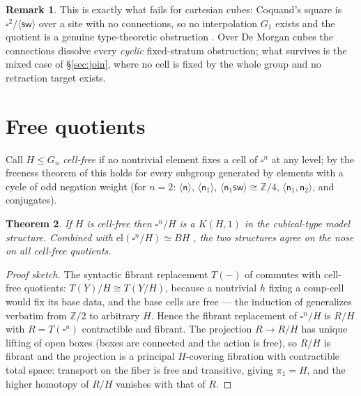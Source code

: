 \documentclass[11pt]{amsart}
\newtheorem{thm}{Theorem}[section]
\theoremstyle{definition}
\newtheorem{rem}[thm]{Remark}
\newcommand{\el}{\mathrm{el}}
\newcommand{\sw}{\mathsf{sw}}
\newcommand{\nb}{\mathsf{n}}
\begin{document}
\begin{rem}
  This is exactly what fails for cartesian cubes: Coquand's square
  is $\square^2/\langle\sw\rangle$ over a site with no
  connections, so no interpolation $G_1$ exists and the quotient
  is a genuine type-theoretic obstruction \cite{CoqNote}.  Over De
  Morgan cubes the connections dissolve every \emph{cyclic}
  fixed-stratum obstruction; what survives is the mixed case of
  \S\ref{sec:join}, where no cell is fixed by the whole group and
  no retraction target exists.
\end{rem}

\section{Free quotients}
\label{sec:free}

Call $H \leq G_n$ \emph{cell-free} if no nontrivial element fixes
a cell of $\square^n$ at any level; by the freeness theorem of
\cite{PaperK, PaperL} this holds for every subgroup generated by
elements with a cycle of odd negation weight (for $n = 2$:
$\langle\nb\rangle$, $\langle\nb_1\rangle$,
$\langle\nb_1\sw\rangle \cong \mathbb{Z}/4$,
$\langle\nb_1, \nb_2\rangle$, and conjugates).

\begin{thm}
  \label{thm:free}
  If $H$ is cell-free then $\square^n/H$ is a $K(H,1)$ in the
  cubical-type model structure.  Combined with
  $\el(\square^n/H) \simeq BH$ \cite[Lem.~elBH]{PaperL}, the two
  structures agree on the nose on all cell-free quotients.
\end{thm}

\begin{proof}[Proof sketch]
  The syntactic fibrant replacement $T(-)$ of \cite[\S4]{PaperK}
  commutes with cell-free quotients: $T(Y)/H \cong T(Y/H)$,
  because a nontrivial $h$ fixing a $\mathrm{comp}$-cell would fix
  its base data, and the base cells are free --- the induction of
  \cite[Prop.~4.3]{PaperK} generalizes verbatim from
  $\mathbb{Z}/2$ to arbitrary $H$.  Hence the fibrant replacement
  of $\square^n/H$ is $R/H$ with $R = T(\square^n)$ contractible
  and fibrant.  The projection $R \to R/H$ has unique lifting of
  open boxes (boxes are connected and the action is free), so
  $R/H$ is fibrant and the projection is a principal $H$-covering
  fibration with contractible total space: transport on the fiber
  is free and transitive, giving $\pi_1 = H$, and the higher
  homotopy of $R/H$ vanishes with that of $R$.
\end{proof}
\end{document}
